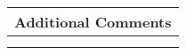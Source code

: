 \documentclass[letterpaper, 10pt]{article} %
\begin{document}
\begin{tabular}{l}

\begin{minipage}{6in} \hspace*{-.175in} {\bf Additional Comments} \vspace*{.25in} \end{minipage} \\ \hline

\begin{minipage}{6in} \vspace*{.25in} \end{minipage} \\ \hline

\begin{minipage}{6in} \vspace*{.25in} \end{minipage} \\ \hline






\end{tabular}
\end{document}
